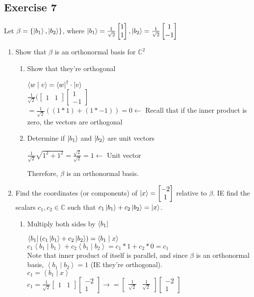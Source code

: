 \documentclass[12pt]{article}
\theoremstyle{plain}
\theoremstyle{nonumberplain}
\theoremstyle{plain}
\theoremstyle{nonumberplain}
\newcommand\1{{\bf 1}}
\newcommand{\bmat}[1]{\begin{bmatrix*} #1 \end{bmatrix*}} %
\newcommand{\C}{\mathbb{C}} %
\newcommand{\<}{\left\langle}
\renewcommand{\>}{\right\rangle}
\newcommand{\inp}[2]{\left\langle#1\mid #2\right\rangle} %
\begin{document}
\subsection{Exercise 7}
Let $\beta=\lbrace\ket{b_1},\ket{b_2}\rbrace$, where $\ket{b_1}=\frac{1}{\sqrt{2}}\bmat{1 \\ 1}, \ket{b_2}=\frac{1}{\sqrt{2}}\bmat{1 \\ -1}$
\begin{enumerate}[label=(\alph*)]
	\item Show that $\beta$ is an orthonormal basis for $\C^2$ \\
	\begin{enumerate}[label=(\roman*)]
		\item Show that they're orthogonal
		\begin{center}
		$\inp{w}{v}=\bra{w}^\dagger\cdot\ket{v}$ \\
		$\frac{1}{\sqrt{2}}(\bmat{1 & 1}\bmat{1 \\ -1}$ \\
		$=\frac{1}{\sqrt{2}}((1*1)+(1*-1))=0\longleftarrow$ Recall that if the inner product is zero, the 					vectors are orthogonal
		\end{center}
		\item Determine if $\ket{b_1}$ and $\ket{b_2}$ are unit vectors
		\begin{center}
		\indent $\frac{1}{\sqrt{2}}\sqrt{1^2+1^2}=\frac{\sqrt{2}}{\sqrt{2}}=1\longleftarrow$ Unit vector
		\end{center}
		Therefore, $\beta$ is an orthonormal basis.
	\end{enumerate}
	\item Find the coordinates (or components) of $\ket{x}=\bmat{-2 \\ 1}$ relative to $\beta$. IE find the 			scalars $c_1, c_2 \in \C$ such that $c_1\ket{b_1}+c_2\ket{b_2}=\ket{x}$.
	\begin{enumerate}[label=(\roman*)]
		\item Multiply both sides by $\bra{b_1}$
		\begin{center}
		$\bra{b_1}(c_1\ket{b_1}+c_2\ket{b_2})=\inp{b_1}{x}$ \\
		$c_1\inp{b_1}{b_1}+c_2\inp{b_1}{b_2} = c_1*1+c_2*0=c_1$ \\ 
		Note that inner product of itself is parallel, and since $\beta$ is an orthonormal basis, $\inp{b_1}{b_2}			=1$ (IE they're orthogonal). \\
		$c_1=\inp{b_1}{x}$ \\
		$c_1=\frac{1}{\sqrt{2}}\bmat{1 & 1}\bmat{-2 \\ 1}\longrightarrow =\bmat{\frac{1}{\sqrt{2}} & \frac{1}				{\sqrt{2}}}\bmat{-2 \\ 1}$ \\

\end{center}
\end{enumerate}
\end{enumerate}
\end{document}
